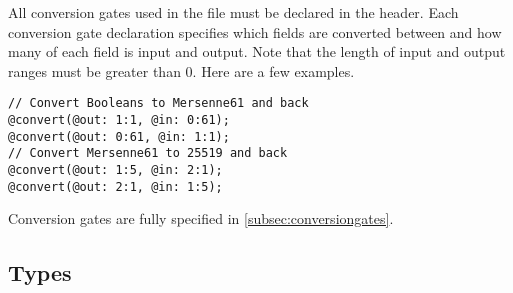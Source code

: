 All conversion gates used in the file must be declared in the header.
Each conversion gate declaration specifies which fields are converted between and how many of each field is input and output.
Note that the length of input and output ranges must be greater than 0.
Here are a few examples.
%
\begin{lstlisting}[language=ir]
// Convert Booleans to Mersenne61 and back
@convert(@out: 1:1, @in: 0:61);
@convert(@out: 0:61, @in: 1:1);
// Convert Mersenne61 to 25519 and back
@convert(@out: 1:5, @in: 2:1);
@convert(@out: 2:1, @in: 1:5);
\end{lstlisting}
Conversion gates are fully specified in \cref{subsec:conversiongates}.

\subsection{Types}\label{sec:types}

